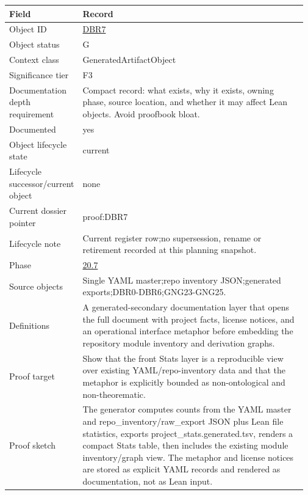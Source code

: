 \begin{longtable}{L{0.16\linewidth} L{0.81\linewidth}}
\hline
\textbf{Field} & \textbf{Record}\\
\hline
Object ID & \hyperlink{object-row-DBR7}{DBR7}\\
\hline\addlinespace[0.20em]
Object status & G\\
\hline\addlinespace[0.20em]
Context class & GeneratedArtifactObject\\
\hline\addlinespace[0.20em]
Significance tier & F3\\
\hline\addlinespace[0.20em]
Documentation depth requirement & Compact record: what exists, why it exists, owning phase, source location, and whether it may affect Lean objects. Avoid proofbook bloat.\\
\hline\addlinespace[0.20em]
Documented & yes\\
\hline\addlinespace[0.20em]
Object lifecycle state & current\\
\hline\addlinespace[0.20em]
Lifecycle successor/\allowbreak{}current object & none\\
\hline\addlinespace[0.20em]
Current dossier pointer & proof:DBR7\\
\hline\addlinespace[0.20em]
Lifecycle note & Current register row;\newline no supersession, rename or retirement recorded at this planning snapshot.\\
\hline\addlinespace[0.20em]
Phase & \hyperlink{phase-row-20-7}{20.7}\\
\hline\addlinespace[0.20em]
Source objects & Single YAML master;\newline repo inventory JSON;\newline generated exports;\newline DBR0-DBR6;\newline GNG23-GNG25.\\
\hline\addlinespace[0.20em]
Definitions & A generated-secondary documentation layer that opens the full document with project facts, license notices, and an operational interface metaphor before embedding the repository module inventory and derivation graphs.\\
\hline\addlinespace[0.20em]
Proof target & Show that the front Stats layer is a reproducible view over existing YAML/\allowbreak{}repo-inventory data and that the metaphor is explicitly bounded as non-ontological and non-theorematic.\\
\hline\addlinespace[0.20em]
Proof sketch & The generator computes counts from the YAML master and repo\_inventory/\allowbreak{}raw\_export JSON plus Lean file statistics, exports project\_stats.generated.tsv, renders a compact Stats table, then includes the existing module inventory/\allowbreak{}graph view. The metaphor and license notices are stored as explicit YAML records and rendered as documentation, not as Lean input.\\

\end{longtable}
